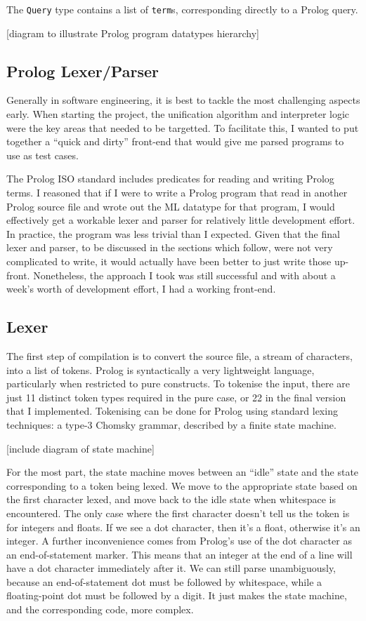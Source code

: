 \documentclass[12pt]{article}
\begin{document}
The \verb|Query| type contains a list of \verb|term|s, corresponding directly to a Prolog query.

[diagram to illustrate Prolog program datatypes hierarchy]

\subsection{Prolog Lexer/Parser}

Generally in software engineering, it is best to tackle the most challenging aspects early. 
When starting the project, the unification algorithm and interpreter logic were the key areas that needed to be targetted. 
To facilitate this, I wanted to put together a ``quick and dirty'' front-end that would give me parsed programs to use as test cases.

The Prolog ISO standard includes predicates for reading and writing Prolog terms. 
I reasoned that if I were to write a Prolog program that read in another Prolog source file and wrote out the ML datatype for that program, I would effectively get a workable lexer and parser for relatively little development effort. 
In practice, the program was less trivial than I expected. 
Given that the final lexer and parser, to be discussed in the sections which follow, were not very complicated to write, it would actually have been better to just write those up-front. 
Nonetheless, the approach I took was still successful and with about a week's worth of development effort, I had a working front-end.

\subsection{Lexer}

The first step of compilation is to convert the source file, a stream of characters, into a list of tokens. 
Prolog is syntactically a very lightweight language, particularly when restricted to pure constructs. 
To tokenise the input, there are just 11 distinct token types required in the pure case, or 22 in the final version that I implemented. 
Tokenising can be done for Prolog using standard lexing techniques: a type-3 Chomsky grammar, described by a finite state machine. 

[include diagram of state machine]

For the most part, the state machine moves between an ``idle'' state and the state corresponding to a token being lexed. 
We move to the appropriate state based on the first character lexed, and move back to the idle state when whitespace is encountered. 
The only case where the first character doesn't tell us the token is for integers and floats. 
If we see a dot character, then it's a float, otherwise it's an integer. 
A further inconvenience comes from Prolog's use of the dot character as an end-of-statement marker. 
This means that an integer at the end of a line will have a dot character immediately after it. 
We can still parse unambiguously, because an end-of-statement dot must be followed by whitespace, while a floating-point dot must be followed by a digit. 
It just makes the state machine, and the corresponding code, more complex.
\end{document}
